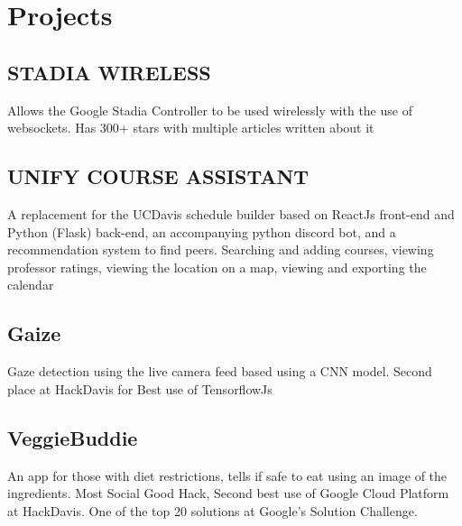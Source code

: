 \documentclass[]{deedy-resume-openfont}
\begin{document}
	\hfill
	\begin{minipage}[t]{0.66\textwidth}
		\section{Projects}
		\begin{projects}
			\subsection*{STADIA WIRELESS}   \vspace{\topsep} \begin{tightemize}\item Allows the Google Stadia Controller to be used wirelessly with the use of websockets. Has 300+ stars with multiple articles written about it\end{tightemize}\subsection*{UNIFY COURSE ASSISTANT}   \vspace{\topsep} \begin{tightemize}\item A replacement for the UCDavis schedule builder based on ReactJs front-end and Python (Flask) back-end, an accompanying python discord bot, and a recommendation system to find peers. Searching and adding courses, viewing professor ratings, viewing the location on a map, viewing and exporting the calendar\end{tightemize}\subsection*{Gaize}   \vspace{\topsep} \begin{tightemize}\item Gaze detection using the live camera feed based using a CNN model. Second place at HackDavis for Best use of TensorflowJs\end{tightemize}\subsection*{VeggieBuddie}   \vspace{\topsep} \begin{tightemize}\item An app for those with diet restrictions, tells if safe to eat using an image of the ingredients. Most Social Good Hack, Second best use of Google Cloud Platform at HackDavis. One of the top 20 solutions at Google’s Solution Challenge.\end{tightemize}
		\end{projects}
		\sectionsep


\end{minipage}
\end{document}
